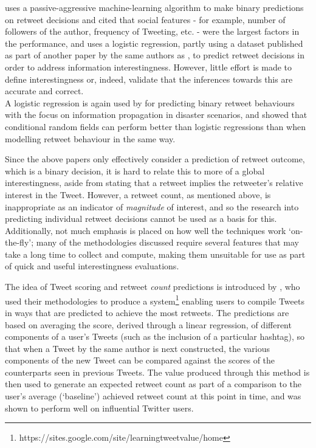 \cite{petrovic11} uses a passive-aggressive machine-learning algorithm to make binary predictions on retweet decisions and cited that social features - for example, number of followers of the author, frequency of Tweeting, etc. - were the largest factors in the performance, and \cite{naveed11} uses a logistic regression, partly using a dataset published as part of another paper by the same authors as \cite{petrovic11}, to predict retweet decisions in order to address information interestingness. However, little effort is made to define interestingness or, indeed, validate that the inferences towards this are accurate and correct.\\
A logistic regression is again used by \cite{zhu11} for predicting binary retweet behaviours with the focus on information propagation in disaster scenarios, and \cite{peng11} showed that conditional random fields can perform better than logistic regressions than when modelling retweet behaviour in the same way.

Since the above papers only effectively consider a prediction of retweet outcome, which is a binary decision, it is hard to relate this to more of a global interestingness, aside from stating that a retweet implies the retweeter's relative interest in the Tweet. However, a retweet count, as mentioned above, is inappropriate as an indicator of \textit{magnitude} of interest, and so the research into predicting individual retweet decisions cannot be used as a basis for this. Additionally, not much emphasis is placed on how well the techniques work `on-the-fly'; many of the methodologies discussed require several features that may take a long time to collect and compute, making them unsuitable for use as part of quick and useful interestingness evaluations.

The idea of Tweet scoring and retweet \textit{count} predictions is introduced by \cite{gransee12}, who used their methodologies to produce a system\footnote{https://sites.google.com/site/learningtweetvalue/home} enabling users to compile Tweets in ways that are predicted to achieve the most retweets. The predictions are based on averaging the score, derived through a linear regression, of different components of a user's Tweets (such as the inclusion of a particular hashtag), so that when a Tweet by the same author is next constructed, the various components of the new Tweet can be compared against the scores of the counterparts seen in previous Tweets. The value produced through this method is then used to generate an expected retweet count as part of a comparison to the user's average (`baseline') achieved retweet count at this point in time, and was shown to perform well on influential Twitter users.

